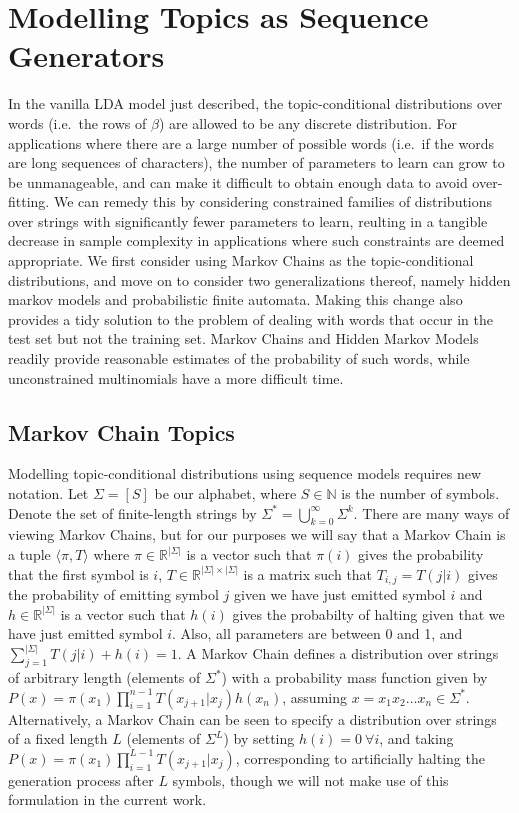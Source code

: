 \documentclass[10pt]{article}
\begin{document}
\section{Modelling Topics as Sequence Generators}
In the vanilla LDA model just described, the topic-conditional distributions over words (i.e.\ the rows of $\beta$) are allowed to be any discrete distribution. For applications where there are a large number of possible words (i.e.\ if the words are long sequences of characters), the number of parameters to learn can grow to be unmanageable, and can make it difficult to obtain enough data to avoid over-fitting. We can remedy this by considering constrained families of distributions over strings with significantly fewer parameters to learn, reulting in a tangible decrease in sample complexity in applications where such constraints are deemed appropriate. We first consider using Markov Chains as the topic-conditional distributions, and move on to consider two generalizations thereof, namely hidden markov models and probabilistic finite automata. Making this change also provides a tidy solution to the problem of dealing with words that occur in the test set but not the training set. Markov Chains and Hidden Markov Models readily provide reasonable estimates of the probability of such words, while unconstrained multinomials have a more difficult time.

\subsection{Markov Chain Topics}
Modelling topic-conditional distributions using sequence models requires new notation. Let $\Sigma = [S]$ be our alphabet, where $S \in \mathbb{N}$ is the number of symbols. Denote the set of finite-length strings by $\Sigma^* = \bigcup_{k=0}^\infty \Sigma^k$. There are many ways of viewing Markov Chains, but for our purposes we will say that a Markov Chain is a tuple $\langle \pi, T\rangle$ where $\pi \in \mathbb{R}^{|\Sigma|}$ is a vector such that $\pi(i)$ gives the probability that the first symbol is $i$, $T \in \mathbb{R}^{|\Sigma| \times |\Sigma|}$ is a matrix such that $T_{i,j} = T(j | i)$ gives the probability of emitting symbol $j$ given we have just emitted symbol $i$ and $h \in \mathbb{R}^{|\Sigma|}$ is a vector such that $h(i)$ gives the probabilty of halting given that we have just emitted symbol $i$. Also, all parameters are between 0 and 1, and $\sum_{j=1}^{|\Sigma|} T(j | i) + h(i) = 1$. A Markov Chain defines a distribution over strings of arbitrary length (elements of $\Sigma^*$) with a probability mass function given by $P(x) = \pi(x_1) \prod_{i=1}^{n-1} T(x_{j+1} | x_j) h(x_n)$, assuming $x = x_1x_2 \dots x_n \in \Sigma^*$. Alternatively, a Markov Chain can be seen to specify a distribution over strings of a fixed length $L$ (elements of $\Sigma^L$) by setting $h(i) = 0~\forall i$, and taking $P(x) = \pi(x_1) \prod_{i=1}^{L-1} T(x_{j+1} | x_j)$, corresponding to artificially halting the generation process after $L$ symbols, though we will not make use of this formulation in the current work.
\end{document}

